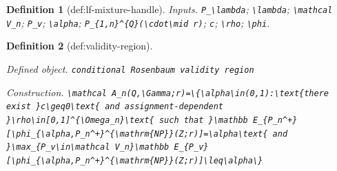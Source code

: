 \documentclass{article}
\newtheorem{definition}{Definition}
\begin{document}
\begin{definition}[def:lf-mixture-handle]
\par\smallskip\noindent\emph{Inputs.} \texttt{P\_\allowbreak{}\textbackslash{}\allowbreak{}lambda}; \texttt{\textbackslash{}\allowbreak{}lambda}; \texttt{\textbackslash{}\allowbreak{}mathcal V\_\allowbreak{}n}; \texttt{P\_\allowbreak{}v}; \texttt{\textbackslash{}\allowbreak{}alpha}; \texttt{P\_\allowbreak{}\{1,\allowbreak{}n\}\allowbreak{}\textasciicircum{}\{Q\}\allowbreak{}(\textbackslash{}\allowbreak{}cdot\textbackslash{}\allowbreak{}mid r)}; \texttt{c}; \texttt{\textbackslash{}\allowbreak{}rho}; \texttt{\textbackslash{}\allowbreak{}phi}.
\end{definition}

\begin{definition}[def:validity-region]\label{def:validity-region}
\par\smallskip\noindent\emph{Defined object.} \texttt{conditional Rosenbaum validity region}
\par\smallskip\noindent\emph{Construction.} \texttt{\textbackslash{}\allowbreak{}mathcal A\_\allowbreak{}n(Q,\allowbreak{}\textbackslash{}\allowbreak{}Gamma;\allowbreak{}r)=\allowbreak{}\textbackslash{}\allowbreak{}\{\textbackslash{}\allowbreak{}alpha\textbackslash{}\allowbreak{}in(0,\allowbreak{}1):\allowbreak{}\textbackslash{}\allowbreak{}text\{there exist \}\allowbreak{}c\textbackslash{}\allowbreak{}geq0\textbackslash{}\allowbreak{}text\{ and assignment-\allowbreak{}dependent \}\allowbreak{}\textbackslash{}\allowbreak{}rho\textbackslash{}\allowbreak{}in[0,\allowbreak{}1]\textasciicircum{}\{\textbackslash{}\allowbreak{}Omega\_\allowbreak{}n\}\allowbreak{}\textbackslash{}\allowbreak{}text\{ such that \}\allowbreak{}\textbackslash{}\allowbreak{}mathbb E\_\allowbreak{}\{P\_\allowbreak{}n\textasciicircum{}+\allowbreak{}\}\allowbreak{}[\textbackslash{}\allowbreak{}phi\_\allowbreak{}\{\textbackslash{}\allowbreak{}alpha,\allowbreak{}P\_\allowbreak{}n\textasciicircum{}+\allowbreak{}\}\allowbreak{}\textasciicircum{}\{\textbackslash{}\allowbreak{}mathrm\{NP\}\allowbreak{}\}\allowbreak{}(Z;\allowbreak{}r)]=\allowbreak{}\textbackslash{}\allowbreak{}alpha\textbackslash{}\allowbreak{}text\{ and \}\allowbreak{}\textbackslash{}\allowbreak{}max\_\allowbreak{}\{P\_\allowbreak{}v\textbackslash{}\allowbreak{}in\textbackslash{}\allowbreak{}mathcal V\_\allowbreak{}n\}\allowbreak{}\textbackslash{}\allowbreak{}mathbb E\_\allowbreak{}\{P\_\allowbreak{}v\}\allowbreak{}[\textbackslash{}\allowbreak{}phi\_\allowbreak{}\{\textbackslash{}\allowbreak{}alpha,\allowbreak{}P\_\allowbreak{}n\textasciicircum{}+\allowbreak{}\}\allowbreak{}\textasciicircum{}\{\textbackslash{}\allowbreak{}mathrm\{NP\}\allowbreak{}\}\allowbreak{}(Z;\allowbreak{}r)]\textbackslash{}\allowbreak{}leq\textbackslash{}\allowbreak{}alpha\textbackslash{}\allowbreak{}\}\allowbreak{}}

\end{definition}
\end{document}
